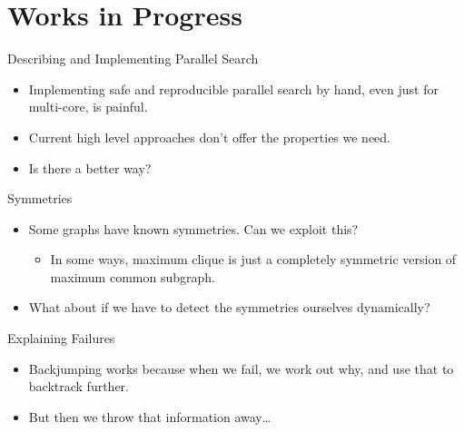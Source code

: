 \documentclass{beamer}
\begin{document}
\section{Works in Progress}

\begin{frame}{Describing and Implementing Parallel Search}

    \begin{itemize}
        \item Implementing safe and reproducible parallel search by hand, even just for multi-core,
            is painful.
        \item Current high level approaches don't offer the properties we need.
        \item Is there a better way?
    \end{itemize}

\end{frame}

\begin{frame}{Symmetries}

    \begin{itemize}
        \item Some graphs have known symmetries. Can we exploit this?

            \begin{itemize}
                \item In some ways, maximum clique is just a completely symmetric version of maximum
                    common subgraph.
            \end{itemize}

        \item What about if we have to detect the symmetries ourselves dynamically?
    \end{itemize}

\end{frame}

\begin{frame}{Explaining Failures}

    \begin{itemize}
        \item Backjumping works because when we fail, we work out why, and use that to backtrack
            further.

        \item But then we throw that information away\ldots
    \end{itemize}

\end{frame}
\end{document}
